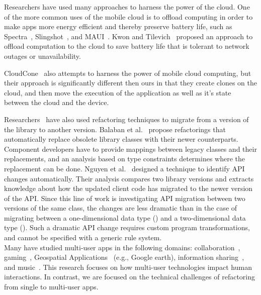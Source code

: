 \documentclass[article]{sigplanconf}
\begin{document}
Researchers have used many approaches to harness the power of the cloud.
One of the more common uses of the mobile cloud is to offload computing in order to make apps more energy efficient and thereby preserve battery life, such as Spectra~\cite{flinn2002balancing}, Slingshot~\cite{su2005slingshot}, and MAUI~\cite{cuervo2010maui}.  
Kwon and Tilevich~\cite{kwon2012energy} proposed an approach to offload computation to the cloud to save battery life that is tolerant to network outages or unavailability.

CloudCone~\cite{chun2011clonecloud} also attempts to harness the power of mobile cloud computing, but their approach is significantly different then ours in that they create clones on the cloud, and then move the execution of the application as well as it's state between the cloud and the device.  

Researchers~\cite{BalabanTF05,Nguyen2010} have also used refactoring techniques to migrate from a version of the library to another version. Balaban et al.~\cite{BalabanTF05} propose
refactorings that automatically replace obsolete library classes with their newer counterparts. Component developers have to provide mappings between legacy classes and their replacements, and an analysis based on type constraints determines where the replacement can be done. Nguyen et al.~\cite{Nguyen2010} designed a technique to identify API changes automatically. Their analysis compares two library versions and extracts knowledge about how the updated client code has migrated to the newer version of the API. 
Since this line of work is investigating API migration between two versions of the same class, the changes are less dramatic than in the case of migrating between a 
one-dimensional data type (\NC) and a two-dimensional data type (\CDT). Such a dramatic API change requires custom program transformations, and cannot be specified with a generic rule system. \\


Many have studied multi-user apps in the following domains: collaboration~\cite{Yuill:multiuserColab, Lopez-Gulliver:imageprocessing}, gaming~\cite{Leichtenstern:multiuserGames}, Geospatial Applications~\cite{Forlines:geospatial} (e.g., Google earth), information sharing~\cite{Nacenta:2012:LMM:2307798.2307816}, and music~\cite{Sorensen:2012:ISM:2399016.2399094}. This research focuses on how multi-user technologies impact human interactions. In contrast, we are focused on the technical challenges of refactoring from single to multi-user apps. \\
\end{document}

